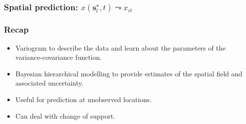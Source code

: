 \documentclass[slidestop,compress,serif,10pt]{beamer}
\begin{document}
\begin{frame}
\frametitle{Spatial prediction:  $x(\bm s_{l}^\star,t) \leadsto x_{it}$}

\begin{center}
\end{center}
\end{frame}
\begin{frame}
\frametitle{Recap}
\begin{itemize}
\vfill\item Variogram to describe the data and learn about the parameters of the variance-covariance function.
\vfill\item Bayesian hierarchical modelling to provide estimates of the spatial field and associated uncertainty.
\vfill\item Useful for prediction at unobserved locations.
\vfill\item Can deal with change of support. 
\end{itemize}
\end{frame}
\end{document}
